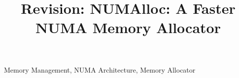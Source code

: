 \documentclass[conference]{IEEEtran}
\newcommand{\todo}[1]{{\color{red}\bfseries [[#1]]}}
\begin{document}
\title{Revision: NUMAlloc: A Faster NUMA Memory Allocator} 


\maketitle

\begin{abstract}

\end{abstract}

\begin{IEEEkeywords}
Memory Management, NUMA Architecture, Memory Allocator
\end{IEEEkeywords}

\thispagestyle{plain}
\pagestyle{plain}












\end{document}
